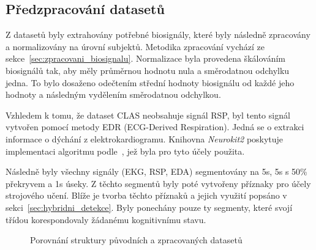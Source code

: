 \subsection{Předzpracování datasetů}
\label{subsec:predzpracovani_datasetu}
Z datasetů byly extrahovány potřebné biosignály, které byly následně zpracovány
a normalizovány na úrovní subjektů. Metodika zpracování vychází ze
sekce~\ref{sec:zpracovani_biosignalu}. Normalizace byla provedena škálováním
biosignálů tak, aby měly průměrnou hodnotu nula a směrodatnou odchylku jedna. To
bylo dosaženo odečtením střední hodnoty biosignálu od každé jeho hodnoty a
následným vydělením směrodatnou odchylkou.

Vzhledem k tomu, že dataset CLAS neobsahuje signál RSP, byl tento signál
vytvořen pomocí metody \gls{EDR} (ECG-Derived Respiration). Jedná se o extrakci
informace o dýchání z elektrokardiogramu. Knihovna \textit{Neurokit2} poskytuje
implementaci algoritmu podle~\cite{VanGent2019}, jež byla pro tyto účely
použita.

Následně byly všechny signály (\gls{EKG}, \gls{RSP}, \gls{EDA}) segmentovány na
5s, 5s s 50\% překryvem a 1s úseky. Z těchto segmentů byly poté vytvořeny
příznaky pro účely strojového učení. Blíže je tvorba těchto příznaků a jejich
využití popsáno v sekci~\ref{sec:hybridni_detekce}. Byly ponechány pouze ty
segmenty, které svojí třídou korespondovaly žádanému kognitivnímu stavu.

\begin{figure}[h]
    \centering
    \caption{Porovnání struktury původních a zpracovaných datasetů}
    \label{fig:struktura_datasetu}
\end{figure}

